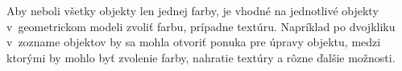 Aby neboli všetky objekty len jednej farby, je vhodné na jednotlivé objekty v~geometrickom modeli zvoliť farbu, prípadne textúru. Napríklad po dvojkliku v~zozname objektov by sa mohla otvoriť ponuka pre úpravy objektu, medzi ktorými by mohlo byť zvolenie farby, nahratie textúry a rôzne ďalšie možnosti.

